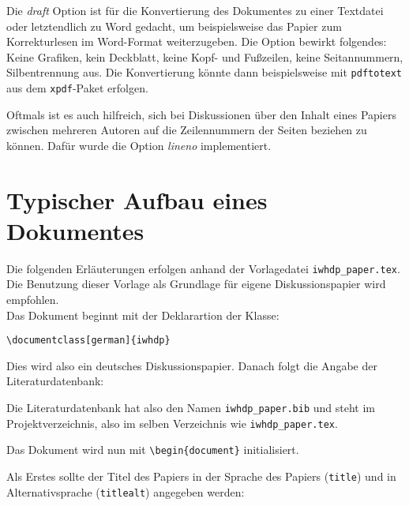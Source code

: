 \documentclass[german]{iwhdp}
\begin{document}
Die \emph{draft} Option ist für die Konvertierung des Dokumentes zu einer Textdatei oder letztendlich zu Word gedacht, um beispielsweise das Papier zum Korrekturlesen im Word-Format weiterzugeben.
Die Option bewirkt folgendes: 
Keine Grafiken, kein Deckblatt, keine Kopf- und Fußzeilen, keine Seitannummern, Silbentrennung aus.
Die Konvertierung könnte dann beispielsweise mit \texttt{pdftotext} aus dem \texttt{xpdf}-Paket erfolgen.


Oftmals ist es auch hilfreich, sich bei Diskussionen über den Inhalt eines Papiers zwischen mehreren Autoren 
auf die Zeilennummern der Seiten beziehen zu können. 
Dafür wurde die Option \emph{lineno} implementiert.



\section{Typischer Aufbau eines Dokumentes}
%
Die folgenden Erläuterungen erfolgen anhand der Vorlagedatei \texttt{iwhdp\_paper.tex}.
Die Benutzung dieser Vorlage als Grundlage für eigene Diskussionspapier wird empfohlen.\\ 
Das Dokument beginnt mit der Deklarartion der Klasse:

\verb+\documentclass[german]{iwhdp}+

Dies wird also ein deutsches Diskussionspapier. 
Danach folgt die Angabe der Literaturdatenbank:

\verb++

Die Literaturdatenbank hat also den Namen \texttt{iwhdp\_paper.bib} und steht im Projektverzeichnis, also im selben Verzeichnis wie \texttt{iwhdp\_paper.tex}.


Das Dokument wird nun mit
\verb+\begin{document}+
initialisiert.


Als Erstes sollte der Titel des Papiers in der Sprache des Papiers (\texttt{title}) und in Alternativsprache (\texttt{titlealt}) angegeben werden:
\end{document}
